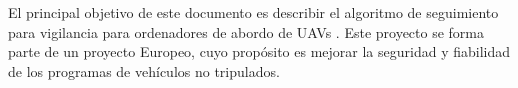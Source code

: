
El principal objetivo de este documento es describir el algoritmo de seguimiento para vigilancia para ordenadores de abordo de UAVs \cite{Image_processing_UAV}. Este proyecto se forma parte de un proyecto Europeo, cuyo prop\'osito es mejorar la seguridad y fiabilidad de los programas de vehículos no tripulados.

 
